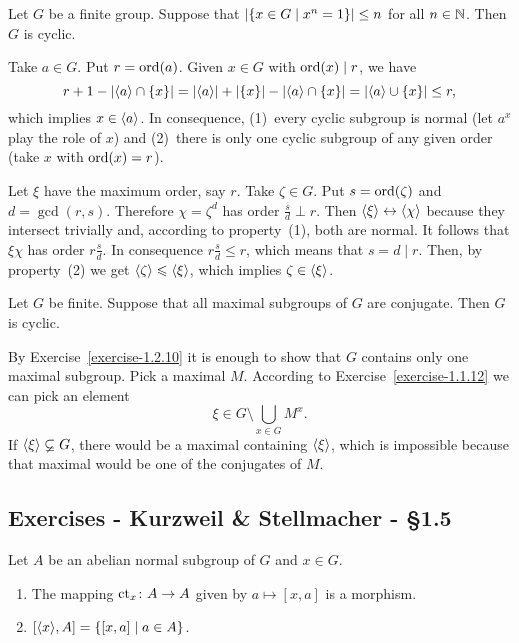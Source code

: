 \begin{exr}
    Let\/ $G$ be a finite group. Suppose that\/ $|\{x\in G \mid x^n = 1\}| \le n$ for all\/ $n\in\mathbb{N}$. Then\/ $G$ is cyclic.
\end{exr}

\begin{solution} Take $a\in G$. Put $r={\rm ord}(a)$. Given $x\in G$ with ${\rm ord}(x)\mid r$, we have
$$
    r+1-|\langle a\rangle\cap\{x\}|
        = |\langle a\rangle|+|\{x\}|-|\langle a\rangle\cap\{x\}|
        = |\langle a\rangle\cup\{x\}|\le r,
$$
which implies $x\in\langle a\rangle$. In consequence, (1)~every cyclic subgroup is normal (let $a^x$ play the role of $x$) and (2)~there is only one cyclic subgroup of any given order (take $x$ with ${\rm ord}(x)=r$).

Let $\xi$ have the maximum order, say $r$. Take $\zeta\in G$. Put $s={\rm ord}(\zeta)$ and $d=\gcd(r,s)$. Therefore $\chi=\zeta^d$ has order $\frac sd\perp r$. Then $\langle\xi\rangle\leftrightarrow\langle\chi\rangle$ because they intersect trivially and, according to property~(1), both are normal. It follows that $\xi\chi$ has order $r\frac sd$. In consequence $r\frac sd\le r$, which means that $s=d\mid r$. Then, by property~(2) we get $\langle\zeta\rangle\leqslant\langle\xi\rangle$, which implies $\zeta\in\langle\xi\rangle$.  \end{solution}

\begin{exr}
    Let\/ $G$ be finite. Suppose that all maximal subgroups of\/ $G$ are conjugate. Then\/ $G$ is cyclic.
\end{exr}

\begin{solution} By Exercise~\ref{exercise-1.2.10} it is enough to show that $G$ contains only one maximal subgroup. Pick a maximal $M$. According to Exercise~\ref{exercise-1.1.12} we can pick an element
$$
    \xi\in G\setminus\bigcup_{x\in G}M^x.
$$
If $\langle\xi\rangle\varsubsetneq G$, there would be a maximal containing $\langle\xi\rangle$, which is impossible because that maximal would be one of the conjugates of $M$.  \end{solution}

\subsection{Exercises - Kurzweil \& Stellmacher - \S 1.5}

\begin{exr}\label{exercise-1.5.1}
    Let\/ $A$ be an abelian normal subgroup of\/ $G$ and\/ $x \in G$.
    \begin{enumerate}[\rm a)]
        \item The mapping\/ $\operatorname{\operatorname{ct}}_x\colon A\to A$ given by\/ $a \mapsto [x, a]$ is a morphism.
        \item $[\langle x\rangle, A] = \{[x, a] \mid a \in A\}$.
    \end{enumerate}
\end{exr}

